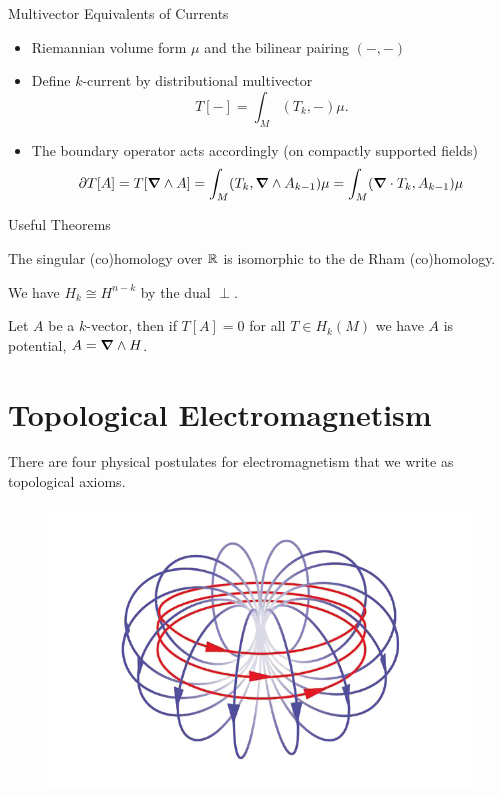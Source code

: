 \documentclass[aspectratio=169]{beamer}
\begin{document}
\begin{frame}{Multivector Equivalents of Currents}
\vfill
\begin{itemize}
	\item Riemannian volume form $\mu$ and the bilinear pairing  $(-,-)$
    \item Define $k$-current by distributional multivector
    \[
    T[-] = \int_M (T_k,-)\mu.
    \]
    \item The boundary operator acts accordingly (on compactly supported fields)
    \[
    \partial T[A] = T[\boldsymbol{\nabla} \wedge A] = \int_M(T_k,\boldsymbol{\nabla} \wedge A_{k-1})\mu = \int_M (\boldsymbol{\nabla} \cdot T_k,A_{k-1})\mu
    \]
\end{itemize}
\vfill
\end{frame}

\begin{frame}{Useful Theorems}
\vfill

    \begin{theorem}
        The singular (co)homology over $\mathbb{R}$ is isomorphic to the de Rham (co)homology.
    \end{theorem}
    \begin{theorem}
        We have $H_k\cong H^{n-k}$ by the dual $\perp$. %
    \end{theorem}
    
    \begin{theorem}[Periods]
    Let $A$ be a $k$-vector, then if $T[A]=0$ for all $T \in H_k(M)$ we have $A$ is potential,  $A=\boldsymbol{\nabla} \wedge H$.
    \end{theorem}

\vfill
\end{frame}

\section{Topological Electromagnetism}

\begin{frame}{}
\vfill
There are four physical postulates for electromagnetism that we write as topological axioms. 
\begin{figure}[H]
	\centering
	\includegraphics[width=.5\textwidth]{figures/top_em.png}
\end{figure}
\vfill
\end{frame}
\end{document}
